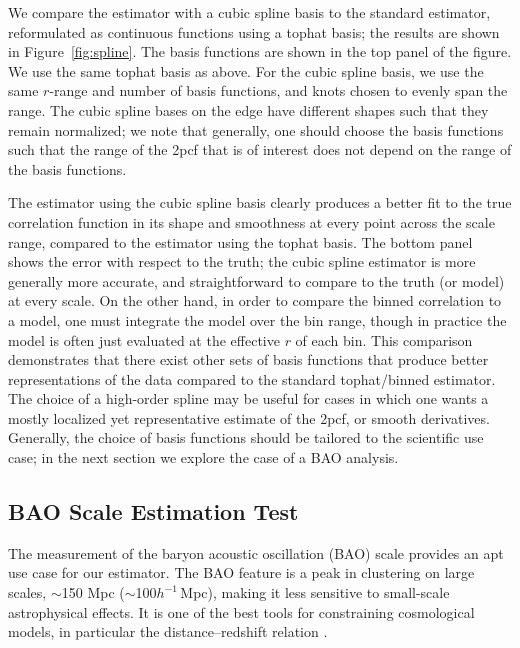 \documentclass[modern]{aastex62}
\newcommand{\cf}{2pcf\xspace} %
\newcommand{\hmpc}{$h^{-1}\,$Mpc}
\begin{document}
We compare the estimator with a cubic spline basis to the standard estimator, reformulated as continuous functions using a tophat basis; the results are shown in Figure~\ref{fig:spline}.
The basis functions are shown in the top panel of the figure.
We use the same tophat basis as above.
For the cubic spline basis, we use the same $r$-range and number of basis functions, and knots chosen to evenly span the range. 
The cubic spline bases on the edge have different shapes such that they remain normalized; we note that generally, one should choose the basis functions such that the range of the \cf that is of interest does not depend on the range of the basis functions.

The estimator using the cubic spline basis clearly produces a better fit to the true correlation function in its shape and smoothness at every point across the scale range, compared to the estimator using the tophat basis.
The bottom panel shows the error with respect to the truth; the cubic spline estimator is more generally more accurate, and straightforward to compare to the truth (or model) at every scale.
On the other hand, in order to compare the binned correlation to a model, one must integrate the model over the bin range, though in practice the model is often just evaluated at the effective $r$ of each bin.
This comparison demonstrates that there exist other sets of basis functions that produce better representations of the data compared to the standard tophat/binned estimator.
The choice of a high-order spline may be useful for cases in which one wants a mostly localized yet representative estimate of the \cf, or smooth derivatives.
Generally, the choice of basis functions should be tailored to the scientific use case; in the next section we explore the case of a BAO analysis.


\subsection{BAO Scale Estimation Test}
\label{sec:bao}

The measurement of the baryon acoustic oscillation (BAO) scale provides an apt use case for our estimator.
The BAO feature is a peak in clustering on large scales, $\sim$150 Mpc ($\sim$100\hmpc), making it less sensitive to small-scale astrophysical effects.
It is one of the best tools for constraining cosmological models, in particular the distance--redshift relation \citep{Eisenstein2005, Kazin2010, Anderson2012, Anderson2014, Alam2016}.
\end{document}
